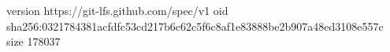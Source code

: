version https://git-lfs.github.com/spec/v1
oid sha256:0321784381acfdfc53cd217b6c62c5f6c8af1e83888be2b907a48ed3108e557c
size 178037
